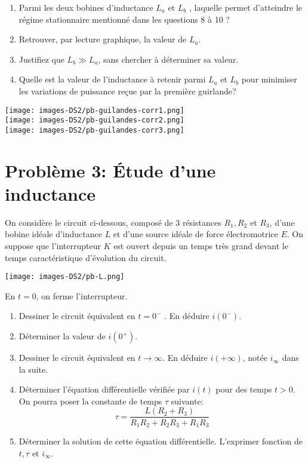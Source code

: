 \begin{enumerate}
\def\labelenumi{\arabic{enumi}.}
\setcounter{enumi}{13}
\item
  Parmi les deux bobines d'inductance \(L_a\) et \(L_b\) , laquelle
  permet d'atteindre le régime stationnaire mentionné dans les questions
  8 à 10 ?
\item
  Retrouver, par lecture graphique, la valeur de \(L_a\).
\item
  Justifiez que \(L_b \gg L_a\), sans chercher à déterminer sa valeur.
\item
  Quelle est la valeur de l'inductance à retenir parmi \(L_a\) et
  \(L_b\) pour minimiser les variations de puissance reçue par la
  première guirlande?
\end{enumerate}

\newpage

\texttt{[image: images-DS2/pb-guilandes-corr1.png]}\\
\texttt{[image: images-DS2/pb-guilandes-corr2.png]}\\
\texttt{[image: images-DS2/pb-guilandes-corr3.png]}

\hypertarget{probluxe8me-3-uxe9tude-dune-inductance}{%
\section*{Problème 3: Étude d'une
inductance}\label{probluxe8me-3-uxe9tude-dune-inductance}}

On considère le circuit ci-dessous, composé de 3 résistances
\(R_1 , R_2\) et \(R_3\), d'une bobine idéale d'inductance \(L\) et
d'une source idéale de force électromotrice \(E\). On suppose que
l'interrupteur \(K\) est ouvert depuis un temps très grand devant le
temps caractéristique d'évolution du circuit.

\texttt{[image: images-DS2/pb-L.png]}

En \(t = 0\), on ferme l'interrupteur.

\begin{enumerate}
\def\labelenumi{\arabic{enumi}.}
\item
  Dessiner le circuit équivalent en \(t = 0^-\) . En déduire \(i(0^-)\).
\item
  Déterminer la valeur de \(i(0^+)\).
\item
  Dessiner le circuit équivalent en \(t \to\infty\). En déduire
  \(i(+\infty)\), notée \(i_\infty\) dans la suite.
\item
  Déterminer l'équation différentielle vérifiée par \(i(t)\) pour des
  temps \(t > 0\). On pourra poser la constante de temps \(\tau\)
  suivante: \[\tau = \dfrac{L(R_2 + R_3)}{R_1R_2 + R_2R_3 + R_1R_3}\]
\item
  Déterminer la solution de cette équation différentielle. L'exprimer
  fonction de \(t, \tau\) et \(i_\infty\).
\end{enumerate}

